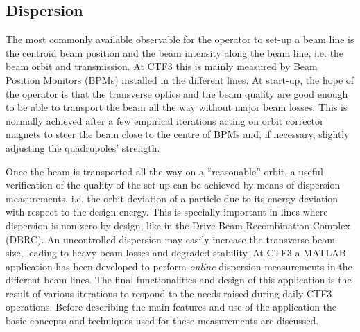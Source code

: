 \subsection{Dispersion}

The most commonly available observable for the operator to set-up a beam line is the
centroid beam position and the beam intensity along the beam line, 
i.e. the beam orbit and transmission. 
At CTF3 this is mainly measured by Beam Position Monitors (BPMs) installed
in the different lines.
At start-up, the hope of the operator is that the transverse optics and the beam quality
are good enough to be able to transport the beam all the way without major beam losses.
This is normally achieved after a few empirical iterations acting on orbit corrector
magnets to steer the beam close to the centre of BPMs and, if necessary, slightly
adjusting the quadrupoles' strength.

Once the beam is transported all the way on a ``reasonable'' orbit, a useful verification
of the quality of the set-up can be achieved by means of dispersion measurements, i.e. the
orbit deviation of a particle due to its energy deviation with respect to the design
energy.
This is specially important in lines where dispersion is non-zero by design, 
like in the Drive Beam Recombination Complex (DBRC). 
An uncontrolled dispersion may easily increase the transverse beam size, 
leading to heavy beam losses and degraded stability.
At CTF3 a MATLAB application has been developed to perform \emph{online} dispersion
measurements in the different beam lines.
The final functionalities and design of this application is the result of various
iterations to respond to the needs raised during daily CTF3 operations.
Before describing the main features and use of the application
the basic concepts and techniques used for these measurements are discussed.


